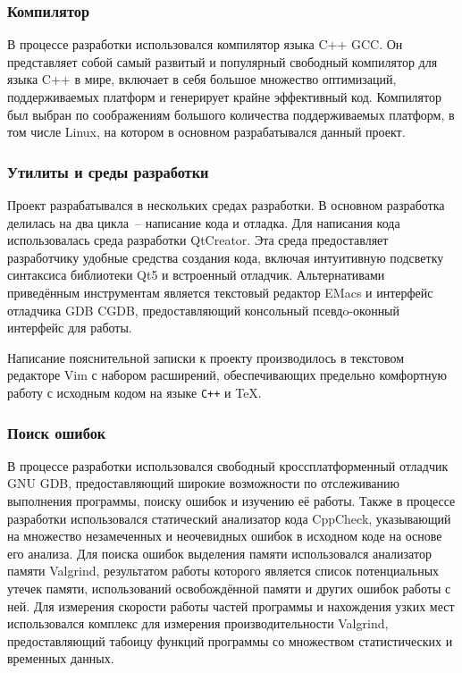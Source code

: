 \subsubsection{Компилятор}

В процессе разработки использовался компилятор языка C++ GCC.
Он представляет собой самый развитый и популярный свободный
компилятор для языка C++ в мире, включает в себя большое множество оптимизаций,
поддерживаемых платформ и генерирует крайне эффективный код.
Компилятор был выбран по соображениям
большого количества поддерживаемых платформ, в том числе Linux, на котором в
основном разрабатывался данный проект.

\subsubsection{Утилиты и среды разработки}

Проект разрабатывался в нескольких средах разработки. В основном разработка
делилась на два цикла~-- написание кода и отладка. Для написания кода
использовалась среда разработки QtCreator. Эта среда предоставляет
разработчику удобные средства создания кода, включая интуитивную подсветку синтаксиса
библиотеки Qt5 и встроенный отладчик.
Альтернативами приведённым инструментам является текстовый редактор
EMacs и интерфейс отладчика GDB CGDB, предоставляющий консольный
псевдo-оконный интерфейс для работы.

Написание пояснительной записки к проекту производилось в текстовом редакторе Vim с набором расширений, обеспечивающих
предельно комфортную работу с исходным кодом на языке \verb|C++| и \TeX.

\subsubsection{Поиск ошибок}

В процессе разработки использовался свободный кроссплатформенный отладчик GNU
GDB, предоставляющий широкие возможности по отслеживанию выполнения программы,
поиску ошибок и изучению её работы. Также в процессе разработки использовался
статический анализатор кода CppCheck, указывающий на множество незамеченных и
неочевидных ошибок в исходном коде на основе его анализа. Для поиска ошибок
выделения памяти использовался анализатор памяти Valgrind, результатом работы
которого является список потенциальных утечек памяти, использований
освобождённой памяти и других ошибок работы с ней. Для измерения скорости работы
частей программы и нахождения узких мест использовался комплекс для измерения
производительности Valgrind, предоставляющий табоицу функций программы со
множеством статистических и временных данных.

